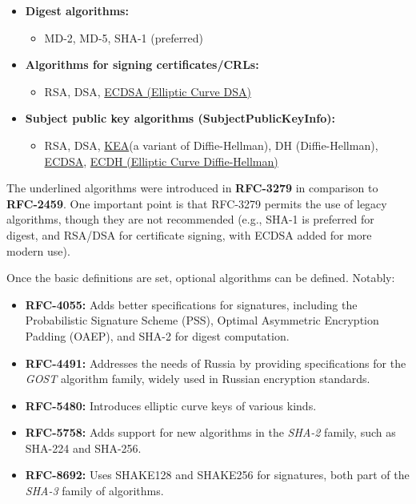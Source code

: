 \begin{itemize}
  \item \textbf{Digest algorithms:}
  \begin{itemize}
    \item MD-2, MD-5, SHA-1 (preferred)
  \end{itemize}
  \item \textbf{Algorithms for signing certificates/CRLs:}
  \begin{itemize}
    \item RSA, DSA, \underline{ECDSA (Elliptic Curve DSA)}
  \end{itemize}
  \item \textbf{Subject public key algorithms (SubjectPublicKeyInfo):}
  \begin{itemize}
    \item RSA, DSA, \underline{KEA}(a variant of Diffie-Hellman), DH
      (Diffie-Hellman), \underline{ECDSA}, \underline{ECDH (Elliptic
      Curve Diffie-Hellman)}
  \end{itemize}
\end{itemize}

The underlined algorithms were introduced in \textbf{RFC-3279} in 
comparison to \textbf{RFC-2459}. One important point is that RFC-3279 
permits the use of legacy algorithms, though they are not recommended 
(e.g., SHA-1 is preferred for digest, and RSA/DSA for certificate 
signing, with ECDSA added for more modern use). 

Once the basic definitions are set, optional algorithms can be defined. 
Notably:

\begin{itemize}
  \item \textbf{RFC-4055:} Adds better specifications for signatures, 
    including the Probabilistic Signature Scheme (PSS), Optimal 
    Asymmetric Encryption Padding (OAEP), and SHA-2 for digest 
    computation.
  \item \textbf{RFC-4491:} Addresses the needs of Russia by providing 
    specifications for the \emph{GOST} algorithm family, widely used 
    in Russian encryption standards.
  \item \textbf{RFC-5480:} Introduces elliptic curve keys of various 
    kinds.
  \item \textbf{RFC-5758:} Adds support for new algorithms in the 
    \emph{SHA-2} family, such as SHA-224 and SHA-256.
  \item \textbf{RFC-8692:} Uses SHAKE128 and SHAKE256 for signatures, 
    both part of the \emph{SHA-3} family of algorithms.
\end{itemize}

